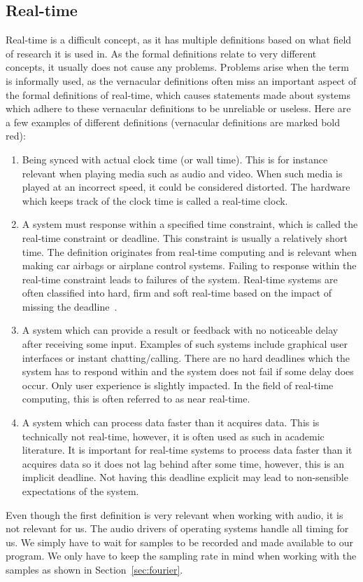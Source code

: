 \documentclass[a4paper,10pt,twocolumn]{article}
\begin{document}
\subsection{Real-time}
Real-time is a difficult concept, as it has multiple definitions based on what field of research it is used in. As the formal definitions relate to very different concepts, it usually does not cause any problems. Problems arise when the term is informally used, as the vernacular definitions often miss an important aspect of the formal definitions of real-time, which causes statements made about systems which adhere to these vernacular definitions to be unreliable or useless. Here are a few examples of different definitions (vernacular definitions are marked bold red):
\begin{enumerate}
    \item Being synced with actual clock time (or wall time). This is for instance relevant when playing media such as audio and video. When such media is played at an incorrect speed, it could be considered distorted. The hardware which keeps track of the clock time is called a real-time clock.
    \item A system must response within a specified time constraint, which is called the real-time constraint or deadline. This constraint is usually a relatively short time. The definition originates from real-time computing and is relevant when making car airbags or airplane control systems. Failing to response within the real-time constraint leads to failures of the system. Real-time systems are often classified into hard, firm and soft real-time based on the impact of missing the deadline~\cite{realclass}.
    \bfseries\color{red}\item\color{black}\normalfont A system which can provide a result or feedback with no noticeable delay after receiving some input. Examples of such systems include graphical user interfaces or instant chatting/calling. There are no hard deadlines which the system has to respond within and the system does not fail if some delay does occur. Only user experience is slightly impacted. In the field of real-time computing, this is often referred to as near real-time.
    \bfseries\color{red}\item\color{black}\normalfont A system which can process data faster than it acquires data. This is technically not real-time, however, it is often used as such in academic literature. It is important for real-time systems to process data faster than it acquires data so it does not lag behind after some time, however, this is an implicit deadline. Not having this deadline explicit may lead to non-sensible expectations of the system.
\end{enumerate}
Even though the first definition is very relevant when working with audio, it is not relevant for us. The audio drivers of operating systems handle all timing for us. We simply have to wait for samples to be recorded and made available to our program. We only have to keep the sampling rate in mind when working with the samples as shown in Section~\ref{sec:fourier}.
\end{document}
